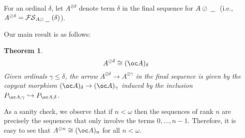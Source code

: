 \documentclass[11pt]{article} %
\theoremstyle{plain} %
\newtheorem{theorem}{Theorem}[section]
\theoremstyle{definition} %
\theoremstyle{note}
\theoremstyle{exercisestyle}
\newcommand{\sequoid}{\oslash}
\newcommand{\blank}{\;\underline{\hspace{1.5ex}}\;}
\newcommand{\FS}{\mathcal{FS}}
\begin{document}
For an ordinal $\delta$, let $A^{\sequoid\delta}$ denote term $\delta$ in the final sequence for $A\sequoid\blank$ (i.e., $A^{\sequoid\delta}=\FS_{A\sequoid\blank}(\delta)$).  

Our main result is as follows:

\begin{theorem}
  \label{MainFinalSequenceResult}
  \[
    A^{\sequoid\delta}\cong (\oc A)_\delta
    \]
  Given ordinals $\gamma\le\delta$, the arrow $A^{\sequoid\delta}\to A^{\sequoid\gamma}$ in the final sequence is given by the copycat morphism $(\oc A)_\delta\to(\oc A)_\gamma$ induced by the inclusion $P_{\oc A, \gamma}\hookrightarrow P_{\oc A, \delta}$.  
\end{theorem}

As a sanity check, we observe that if $n<\omega$ then the sequences of rank $n$ are precisely the sequences that only involve the terms $0,\dots,n-1$.  Therefore, it is easy to see that $A^{\sequoid n}\cong(\oc A)_n$ for all $n<\omega$.  
\end{document}
